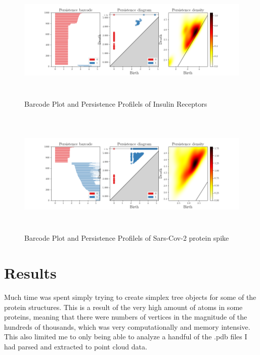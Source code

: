 \documentclass[12pt]{article}
\begin{document}
            \begin{figure}[H]
                \centering
                \includegraphics[height=6cm]{figures/1IRK.png}%
                \caption{Barcode Plot and Persistence Profilels of Insulin Receptors}%
                \label{fig:2}
            \end{figure}

            \begin{figure}[H]
                \centering
                \includegraphics[height=6cm]{figures/6crz.png}%
                \caption{Barcode Plot and Persistence Profilels of Sars-Cov-2 protein spike}%
                \label{fig:3}
            \end{figure}

    \section{Results}
        \label{sec:results}
        Much time was spent simply trying to create simplex tree objects for some of the protein structures. This is a result of the very high amount
        of atoms in some proteins, meaning that there were numbers of vertices in the magnitude of the hundreds of thousands, which was very computationally
        and memory intensive. This also limited me to only being able to analyze a handful of the .pdb files I had parsed and extracted to point cloud
        data. 
\end{document}
